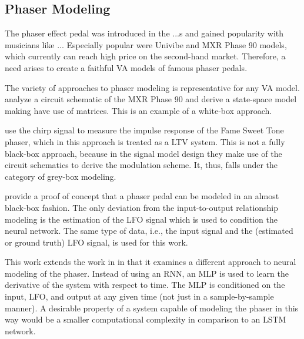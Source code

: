 \subsection{Phaser Modeling}

The phaser effect pedal was introduced in the ...s and gained popularity with musicians like ... Especially popular were Univibe and MXR Phase 90 models, which currently can reach high price on the second-hand market. Therefore, a need arises to create a faithful \ac{VA} models of famous phaser pedals.

The variety of approaches to phaser modeling is representative for any \ac{VA} model. \cite{Eichas2014} analyze a circuit schematic of the MXR Phase 90 and derive a state-space model making have use of matrices. This is an example of a white-box approach.

\cite{Kiiski2016} use the chirp signal to measure the impulse response of the Fame Sweet Tone phaser, which in this approach is treated as a \ac{LTV} system. This is not a fully black-box approach, because in the signal model design they make use of the circuit schematics to derive the modulation scheme. It, thus, falls under the category of grey-box modeling.

\cite{Wright2020} provide a proof of concept that a phaser pedal can be modeled in an almost black-box fashion. The only deviation from the input-to-output relationship modeling is the estimation of the \ac{LFO} signal which is used to condition the neural network. The same type of data, i.e., the input signal and the (estimated or ground truth) \ac{LFO} signal, is used for this work.

This work extends the work in \cite{Wright2020} in that it examines a different approach to neural modeling of the phaser. Instead of using an \ac{RNN}, an \ac{MLP} is used to learn the derivative of the system with respect to time. The \ac{MLP} is conditioned on the input, \ac{LFO}, and output at any given time (not just in a sample-by-sample manner). A desirable property of a system capable of modeling the phaser in this way would be a smaller computational complexity in comparison to an \ac{LSTM} network.
